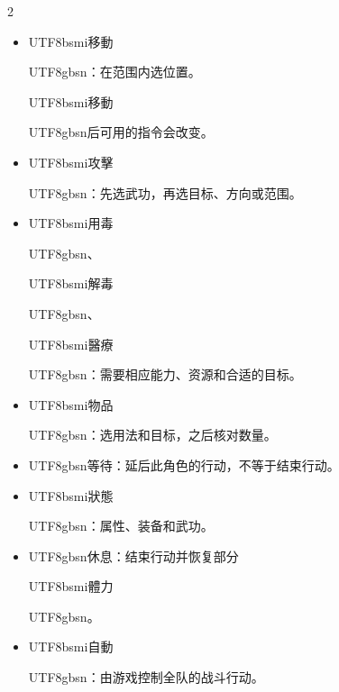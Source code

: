 \begin{paracol}{2}
\begin{itemize}[leftmargin=*,topsep=1pt,itemsep=0pt,parsep=0pt]\item \begin{CJK}{UTF8}{bsmi}移動\end{CJK}\begin{CJK}{UTF8}{gbsn}：在范围内选位置。\end{CJK}\begin{CJK}{UTF8}{bsmi}移動\end{CJK}\begin{CJK}{UTF8}{gbsn}后可用的指令会改变。\end{CJK}\item \begin{CJK}{UTF8}{bsmi}攻擊\end{CJK}\begin{CJK}{UTF8}{gbsn}：先选武功，再选目标、方向或范围。\end{CJK}\item \begin{CJK}{UTF8}{bsmi}用毒\end{CJK}\begin{CJK}{UTF8}{gbsn}、\end{CJK}\begin{CJK}{UTF8}{bsmi}解毒\end{CJK}\begin{CJK}{UTF8}{gbsn}、\end{CJK}\begin{CJK}{UTF8}{bsmi}醫療\end{CJK}\begin{CJK}{UTF8}{gbsn}：需要相应能力、资源和合适的目标。\end{CJK}\item \begin{CJK}{UTF8}{bsmi}物品\end{CJK}\begin{CJK}{UTF8}{gbsn}：选用法和目标，之后核对数量。\end{CJK}\item \begin{CJK}{UTF8}{gbsn}等待：延后此角色的行动，不等于结束行动。\end{CJK}\item \begin{CJK}{UTF8}{bsmi}狀態\end{CJK}\begin{CJK}{UTF8}{gbsn}：属性、装备和武功。\end{CJK}\item \begin{CJK}{UTF8}{gbsn}休息：结束行动并恢复部分\end{CJK}\begin{CJK}{UTF8}{bsmi}體力\end{CJK}\begin{CJK}{UTF8}{gbsn}。\end{CJK}\item \begin{CJK}{UTF8}{bsmi}自動\end{CJK}\begin{CJK}{UTF8}{gbsn}：由游戏控制全队的战斗行动。\end{CJK}\end{itemize}

\end{paracol}
